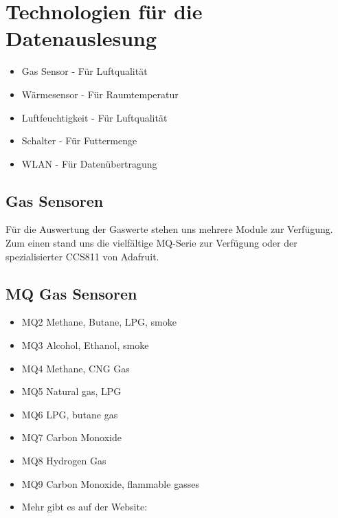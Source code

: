 \newpage
\def \currentAuthor{Kevin Glatz}


\section{Technologien für die Datenauslesung}

\begin{itemize}
	\item Gas Sensor - Für Luftqualität
	\item Wärmesensor - Für Raumtemperatur	
	\item Luftfeuchtigkeit - Für Luftqualität
	\item Schalter - Für Futtermenge
	\item WLAN - Für Datenübertragung

\end{itemize}

\subsection{Gas Sensoren}
Für die Auswertung der Gaswerte stehen uns mehrere Module zur Verfügung.  Zum einen stand uns die vielfältige MQ-Serie zur Verfügung oder der spezialisierter CCS811 von Adafruit. 

\subsection{MQ Gas Sensoren}


\begin{itemize}
\item {MQ2}
	Methane, Butane, LPG, smoke
\item {MQ3}
	Alcohol, Ethanol, smoke
\item {MQ4}
	Methane, CNG Gas
\item {MQ5}
	Natural gas, LPG
\item {MQ6}
	LPG, butane gas
\item {MQ7}
	Carbon Monoxide
\item {MQ8}
	Hydrogen Gas
\item {MQ9}
	Carbon Monoxide, flammable gasses
\item Mehr gibt es auf der Website: \cite{MQ_Sensoren}
\end{itemize}

